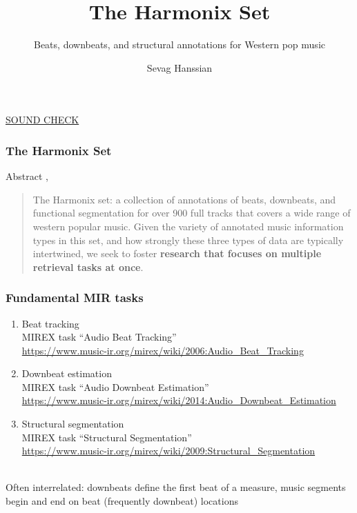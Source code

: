 \documentclass{beamer}
\title{The Harmonix Set}
\subtitle{Beats, downbeats, and structural annotations for Western pop music}
\author{Sevag Hanssian}
\institute{MUMT 621, Winter 2021}
\begin{document}
\begin{frame}
\maketitle
\href{run:./funkybass.wav}{SOUND CHECK}
\end{frame}

\begin{frame}
	\frametitle{The Harmonix Set}
	Abstract , 
	\begin{quote}
	The Harmonix set: a collection of annotations of beats, downbeats, and functional segmentation for over 900 full tracks that covers a wide range of western popular music.  Given the variety of annotated music information types in this set, and how strongly these three types of data are typically intertwined,  we seek to foster \textbf{research that focuses on multiple retrieval tasks at once}.
	\end{quote}
\end{frame}


\begin{frame}
	\frametitle{Fundamental MIR tasks}
	\begin{enumerate}
		\item
			Beat tracking\ \\
			MIREX task ``Audio Beat Tracking''\\
			\href{https://www.music-ir.org/mirex/wiki/2006:Audio_Beat_Tracking}{https://www.music-ir.org/mirex/wiki/2006:Audio\_Beat\_Tracking}
		\item
			Downbeat estimation\ \\
			MIREX task ``Audio Downbeat Estimation''\\
			\href{https://www.music-ir.org/mirex/wiki/2014:Audio_Downbeat_Estimation}{https://www.music-ir.org/mirex/wiki/2014:Audio\_Downbeat\_Estimation}
		\item
			Structural segmentation\ \\
			MIREX task ``Structural Segmentation''\\
			\href{https://www.music-ir.org/mirex/wiki/2009:Structural_Segmentation}{https://www.music-ir.org/mirex/wiki/2009:Structural\_Segmentation}
	\end{enumerate}\ \\
	\vspace{2em}
	Often interrelated: downbeats define the first beat of a measure, music segments begin and end on beat (frequently downbeat) locations
\end{frame}
\end{document}
